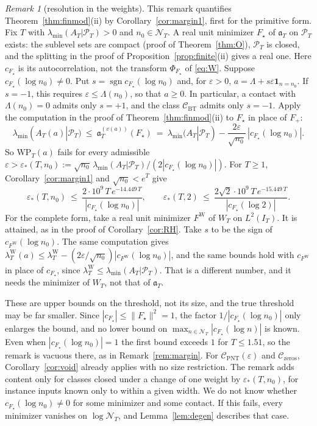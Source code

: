 \documentclass[11pt]{amsart}
\theoremstyle{definition}
\theoremstyle{remark}
\newtheorem{remark}[theorem]{Remark}
\newcommand{\PT}{\mathcal P_T}
\newcommand{\IT}{I_T}
\newcommand{\lamW}{\lambda^{\mathrm W}_T}
\newcommand{\lamA}{\lambda_{\min}(A_T|\PT)}
\newcommand{\NT}{\mathcal N_T}
\begin{document}
\begin{remark}[resolution in the weights]\label{rem:resweights}
This remark quantifies Theorem~\ref{thm:finmod}(ii) by Corollary~\ref{cor:margin1}, first for the
primitive form. Fix $T$ with $\lamA>0$ and $n_0\in\NT$. A real unit minimizer $F_\star$ of
$\mathfrak a_T$ on $\PT$ exists: the sublevel sets are compact (proof of Theorem~\ref{thm:O}), $\PT$ is
closed, and the splitting in the proof of Proposition~\ref{prop:finite}(ii) gives a real one. Here
$c_{F_\star}$ is its autocorrelation, not the transform $\Phi_{F_\star}$ of \eqref{eq:W}. Suppose
$c_{F_\star}(\log n_0)\ne0$. Put $s=\operatorname{sgn}c_{F_\star}(\log n_0)$ and, for $\varepsilon>0$,
$a=\Lambda+s\varepsilon\mathbf 1_{n=n_0}$. If $s=-1$, this requires $\varepsilon\le\Lambda(n_0)$, so
that $a\ge0$. In particular, a contact with $\Lambda(n_0)=0$ admits only $s=+1$, and the class
$\mathcal C_{\mathrm{BT}}$ admits only $s=-1$. Apply the computation in the proof of
Theorem~\ref{thm:finmod}(ii) to $F_\star$ in place of $F_+$:
\[
\lambda_{\min}(A_T(a)|\PT)\ \le\ \mathfrak a^{(v(a))}_T(F_\star)\ =\ \lamA-\frac{2\varepsilon}{\sqrt{n_0}}\,|c_{F_\star}(\log n_0)| .
\]
So $\mathrm{WP}_T(a)$ fails for every admissible $\varepsilon>\varepsilon_*(T,n_0):=\sqrt{n_0}\,\lamA/(2|c_{F_\star}(\log n_0)|)$.
For $T\ge1$, Corollary~\ref{cor:margin1} and $\sqrt{n_0}<e^T$ give
\[
\varepsilon_*(T,n_0)\ \le\ \frac{2\cdot10^9\,T\,e^{-14.449\,T}}{|c_{F_\star}(\log n_0)|},\qquad
\varepsilon_*(T,2)\ \le\ \frac{2\sqrt2\cdot10^9\,T\,e^{-15.449\,T}}{|c_{F_\star}(\log2)|}.
\]
For the complete form, take a real unit minimizer $F^{\mathrm W}$ of $W_T$ on $L^2(\IT)$. It is attained,
as in the proof of Corollary~\ref{cor:RH}. Take $s$ to be the sign of $c_{F^{\mathrm W}}(\log n_0)$. The same
computation gives $\lambda^{\mathrm W}_T(a)\le\lamW-(2\varepsilon/\sqrt{n_0})|c_{F^{\mathrm W}}(\log n_0)|$, and
the same bounds hold with $c_{F^{\mathrm W}}$ in place of $c_{F_\star}$, since $\lamW\le\lamA$. That is a
different number, and it needs the minimizer of $W_T$, not that of $\mathfrak a_T$.

These are upper bounds on the threshold, not its size, and the true threshold may be far smaller.
Since $|c_{F_\star}|\le\|F_\star\|^2=1$, the factor $1/|c_{F_\star}(\log n_0)|$ only enlarges the bound, and
no lower bound on $\max_{n\in\NT}|c_{F_\star}(\log n)|$ is known. Even when $|c_{F_\star}(\log n_0)|=1$ the
first bound exceeds $1$ for $T\le1.51$, so the remark is vacuous there, as in Remark~\ref{rem:margin}. For
$\mathcal C_{\mathrm{PNT}}(\varepsilon)$ and $\mathcal C_{\mathrm{zeros}}$, Corollary~\ref{cor:void}
already applies with no size restriction. The remark adds content only for classes closed under a
change of one weight by $\varepsilon_*(T,n_0)$, for instance inputs known only to within a given width.
We do not know whether $c_{F_\star}(\log n_0)\ne0$ for some minimizer and some contact. If this fails,
every minimizer vanishes on $\log\NT$, and Lemma~\ref{lem:degen} describes that case.
\end{remark}
\end{document}
